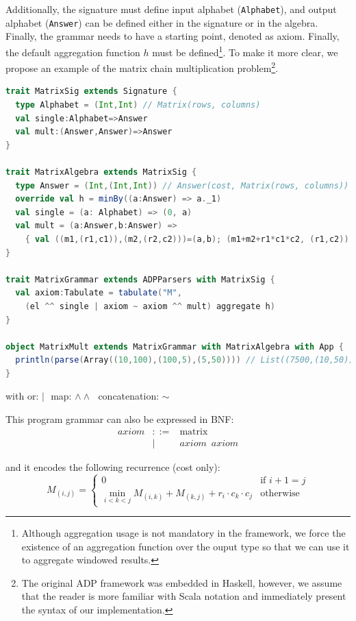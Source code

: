 Additionally, the signature must define input alphabet ({\tt Alphabet}), and output alphabet ({\tt Answer}) can be defined either in the signature or in the algebra. Finally, the grammar needs to have a starting point, denoted as axiom. Finally, the default aggregation function $h$ must be defined\footnote{Although aggregation usage is not mandatory in the framework, we force the existence of an aggregation function over the ouput type so that we can use it to aggregate windowed results.}. To make it more clear, we propose an example of the matrix chain multiplication problem\footnote{The original ADP framework was embedded in Haskell, however, we assume that the reader is more familiar with Scala notation and immediately present the syntax of our implementation.}. 

\newpage
\begin{lstlisting}[language=Scala, caption=Matrix chain mulitiplication DSL implementation]
trait MatrixSig extends Signature {
  type Alphabet = (Int,Int) // Matrix(rows, columns)
  val single:Alphabet=>Answer
  val mult:(Answer,Answer)=>Answer
}

trait MatrixAlgebra extends MatrixSig {
  type Answer = (Int,(Int,Int)) // Answer(cost, Matrix(rows, columns))
  override val h = minBy((a:Answer) => a._1)
  val single = (a: Alphabet) => (0, a)
  val mult = (a:Answer,b:Answer) =>
    { val ((m1,(r1,c1)),(m2,(r2,c2)))=(a,b); (m1+m2+r1*c1*c2, (r1,c2)) }
}

trait MatrixGrammar extends ADPParsers with MatrixSig {
  val axiom:Tabulate = tabulate("M",
    (el ^^ single | axiom ~ axiom ^^ mult) aggregate h)
}

object MatrixMult extends MatrixGrammar with MatrixAlgebra with App {
  println(parse(Array((10,100),(100,5),(5,50)))) // List((7500,(10,50)))
}
\end{lstlisting}
\begin{center}\vspace{-18pt} with or: $|\,\,$ map: $\land\land\,\,$ concatenation: $\sim$ \end{center}

This program grammar can also be expressed in BNF:
\[\begin{array}{lrl}
axiom &::=& \text{matrix} \\
 &|& axiom \,\,\, axiom
\end{array}\]

and it encodes the following recurrence (cost only):
	\[M_{(i,j)}=\left\{\begin{array}{ll}
		0 & \text{if } i+1= j\\
		\min_{i<k<j} M_{(i,k)}+M_{(k,j)}+r_i \cdot c_k \cdot c_j & \text{otherwise}
	\end{array}\right. \]

